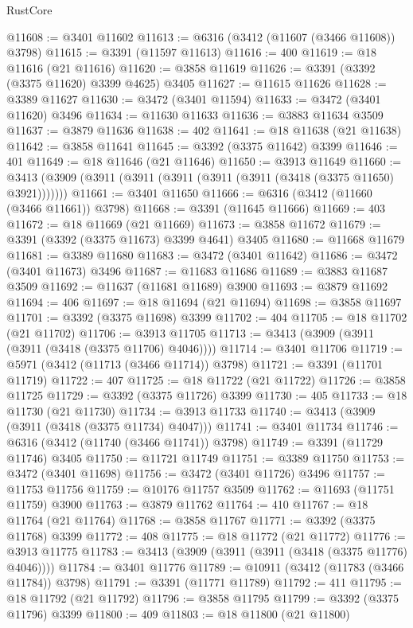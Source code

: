 \begin{lexlean}{RustCore}
\begin{coremodule}
@11608 := @3401 @11602
@11613 := @6316 (@3412 (@11607 (@3466 @11608)) @3798)
@11615 := @3391 (@11597 @11613)
@11616 := 400
@11619 := @18 @11616 (@21 @11616)
@11620 := @3858 @11619
@11626 := @3391 (@3392 (@3375 @11620) @3399 @4625) @3405
@11627 := @11615 @11626
@11628 := @3389 @11627
@11630 := @3472 (@3401 @11594)
@11633 := @3472 (@3401 @11620) @3496
@11634 := @11630 @11633
@11636 := @3883 @11634 @3509
@11637 := @3879 @11636
@11638 := 402
@11641 := @18 @11638 (@21 @11638)
@11642 := @3858 @11641
@11645 := @3392 (@3375 @11642) @3399
@11646 := 401
@11649 := @18 @11646 (@21 @11646)
@11650 := @3913 @11649
@11660 := @3413 (@3909 (@3911 (@3911 (@3911 (@3911 (@3911 (@3418 (@3375 @11650) @3921)))))))
@11661 := @3401 @11650
@11666 := @6316 (@3412 (@11660 (@3466 @11661)) @3798)
@11668 := @3391 (@11645 @11666)
@11669 := 403
@11672 := @18 @11669 (@21 @11669)
@11673 := @3858 @11672
@11679 := @3391 (@3392 (@3375 @11673) @3399 @4641) @3405
@11680 := @11668 @11679
@11681 := @3389 @11680
@11683 := @3472 (@3401 @11642)
@11686 := @3472 (@3401 @11673) @3496
@11687 := @11683 @11686
@11689 := @3883 @11687 @3509
@11692 := @11637 (@11681 @11689) @3900
@11693 := @3879 @11692
@11694 := 406
@11697 := @18 @11694 (@21 @11694)
@11698 := @3858 @11697
@11701 := @3392 (@3375 @11698) @3399
@11702 := 404
@11705 := @18 @11702 (@21 @11702)
@11706 := @3913 @11705
@11713 := @3413 (@3909 (@3911 (@3911 (@3418 (@3375 @11706) @4046))))
@11714 := @3401 @11706
@11719 := @5971 (@3412 (@11713 (@3466 @11714)) @3798)
@11721 := @3391 (@11701 @11719)
@11722 := 407
@11725 := @18 @11722 (@21 @11722)
@11726 := @3858 @11725
@11729 := @3392 (@3375 @11726) @3399
@11730 := 405
@11733 := @18 @11730 (@21 @11730)
@11734 := @3913 @11733
@11740 := @3413 (@3909 (@3911 (@3418 (@3375 @11734) @4047)))
@11741 := @3401 @11734
@11746 := @6316 (@3412 (@11740 (@3466 @11741)) @3798)
@11749 := @3391 (@11729 @11746) @3405
@11750 := @11721 @11749
@11751 := @3389 @11750
@11753 := @3472 (@3401 @11698)
@11756 := @3472 (@3401 @11726) @3496
@11757 := @11753 @11756
@11759 := @10176 @11757 @3509
@11762 := @11693 (@11751 @11759) @3900
@11763 := @3879 @11762
@11764 := 410
@11767 := @18 @11764 (@21 @11764)
@11768 := @3858 @11767
@11771 := @3392 (@3375 @11768) @3399
@11772 := 408
@11775 := @18 @11772 (@21 @11772)
@11776 := @3913 @11775
@11783 := @3413 (@3909 (@3911 (@3911 (@3418 (@3375 @11776) @4046))))
@11784 := @3401 @11776
@11789 := @10911 (@3412 (@11783 (@3466 @11784)) @3798)
@11791 := @3391 (@11771 @11789)
@11792 := 411
@11795 := @18 @11792 (@21 @11792)
@11796 := @3858 @11795
@11799 := @3392 (@3375 @11796) @3399
@11800 := 409
@11803 := @18 @11800 (@21 @11800)

\end{coremodule}
\end{lexlean}
